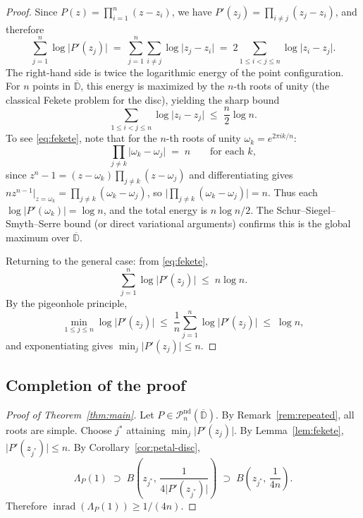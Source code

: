 \documentclass[11pt,a4paper]{amsart}
\theoremstyle{definition}
\newcommand{\D}{\mathbb{D}}
\newcommand{\Pn}{\mathcal{P}_n}
\newcommand{\abs}[1]{\lvert #1 \rvert}
\newcommand{\inrad}{\operatorname{inrad}}
\begin{document}
\begin{proof}
Since $P(z) = \prod_{i=1}^n (z - z_i)$, we have
$P'(z_j) = \prod_{i \neq j} (z_j - z_i)$, and therefore
\[
  \sum_{j=1}^n \log\abs{P'(z_j)}
  \;=\; \sum_{j=1}^n \sum_{i \neq j} \log\abs{z_j - z_i}
  \;=\; 2 \sum_{1 \leq i < j \leq n} \log\abs{z_i - z_j}.
\]
The right-hand side is twice the logarithmic energy of the point
configuration.  For $n$ points in $\overline{\D}$, this energy is maximized
by the $n$-th roots of unity (the classical Fekete problem for the disc),
yielding the sharp bound
\begin{equation}\label{eq:fekete}
  \sum_{1 \leq i < j \leq n} \log\abs{z_i - z_j}
  \;\leq\; \frac{n}{2}\log n.
\end{equation}
To see \eqref{eq:fekete}, note that for the $n$-th roots of unity
$\omega_k = e^{2\pi ik/n}$:
\[
  \prod_{j \neq k} \abs{\omega_k - \omega_j} \;=\; n
  \qquad\text{for each } k,
\]
since $z^n - 1 = (z - \omega_k)\prod_{j \neq k}(z - \omega_j)$ and
differentiating gives $nz^{n-1}\big|_{z=\omega_k} = \prod_{j \neq k}(\omega_k - \omega_j)$,
so $\abs{\prod_{j\neq k}(\omega_k - \omega_j)} = n$.
Thus each $\log\abs{P'(\omega_k)} = \log n$, and the total energy is
$n \log n / 2$.  The Schur--Siegel--Smyth--Serre bound (or direct
variational arguments) confirms this is the global maximum over
$\overline{\D}$.

Returning to the general case: from \eqref{eq:fekete},
\[
  \sum_{j=1}^n \log\abs{P'(z_j)} \;\leq\; n \log n.
\]
By the pigeonhole principle,
\[
  \min_{1 \leq j \leq n} \log\abs{P'(z_j)}
  \;\leq\; \frac{1}{n}\sum_{j=1}^n \log\abs{P'(z_j)}
  \;\leq\; \log n,
\]
and exponentiating gives $\min_j \abs{P'(z_j)} \leq n$.
\end{proof}

\subsection{Completion of the proof}

\begin{proof}[Proof of Theorem~\ref{thm:main}]
Let $P \in \Pn^{\mathrm{nd}}(\overline{\D})$.  By Remark~\ref{rem:repeated},
all roots are simple.  Choose $j^*$ attaining $\min_j \abs{P'(z_j)}$.
By Lemma~\ref{lem:fekete}, $\abs{P'(z_{j^*})} \leq n$.
By Corollary~\ref{cor:petal-disc},
\[
  \Lambda_P(1) \;\supset\;
  B\!\left(z_{j^*},\, \frac{1}{4\abs{P'(z_{j^*})}}\right)
  \;\supset\;
  B\!\left(z_{j^*},\, \frac{1}{4n}\right).
\]
Therefore $\inrad(\Lambda_P(1)) \geq 1/(4n)$.
\end{proof}
\end{document}
